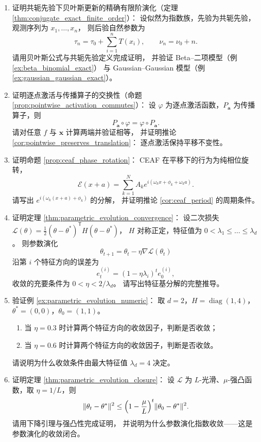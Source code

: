 \begin{enumerate}[leftmargin=3em, label=\textbf{题 \arabic*}]
    \item 证明共轭先验下贝叶斯更新的精确有限阶演化（定理 \ref{thm:conjugate_exact_finite_order}）：
    设似然为指数族，先验为共轭先验，观测序列为 $x_1,\dots,x_n$，
    则后验自然参数为
    \[
    \tau_n=\tau_0+\sum_{i=1}^nT(x_i),\qquad
    \nu_n=\nu_0+n.
    \]
    请用贝叶斯公式与共轭先验定义完成证明，
    并验证 Beta--二项模型（例 \ref{ex:beta_binomial_exact}）
    与 Gaussian--Gaussian 模型（例 \ref{ex:gaussian_gaussian_exact}）。

    \item 证明逐点激活与传播算子的交换性（命题 \ref{prop:pointwise_activation_commutes}）：
    设 $\varphi$ 为逐点激活函数，$P_{\mathbf{a}}$ 为传播算子，则
    \[
    P_{\mathbf{a}}\circ\varphi=\varphi\circ P_{\mathbf{a}}.
    \]
    请对任意 $f$ 与 $\mathbf{x}$ 计算两端并验证相等，
    并证明推论 \ref{cor:pointwise_preserves_translation}：
    逐点激活保持平移不变性。

    \item 证明命题 \ref{prop:ceaf_phase_rotation}：
    CEAF 在平移下的行为为纯相位旋转，
    \[
    \mathcal{E}(x+a)=\sum_{k=1}^{N}A_ke^{i(\omega_kx+\phi_k+\omega_ka)}.
    \]
    请写出 $e^{i(\omega_k(x+a)+\phi_k)}$ 的分解，
    并证明推论 \ref{cor:ceaf_period} 的周期条件。

    \item 证明定理 \ref{thm:parametric_evolution_convergence}：
    设二次损失 $\mathcal{L}(\theta)=\frac12(\theta-\theta^*)^{\mathsf T}H(\theta-\theta^*)$，
    $H$ 对称正定，特征值为 $0<\lambda_1\le\dots\le\lambda_d$。
    则参数演化
    \[
    \theta_{t+1}=\theta_t-\eta\nabla\mathcal{L}(\theta_t)
    \]
    沿第 $i$ 个特征方向的误差为
    \[
    e_t^{(i)}=(1-\eta\lambda_i)^te_0^{(i)},
    \]
    收敛的充要条件为 $0<\eta<2/\lambda_d$。
    请写出特征基分解的完整推导。

    \item 验证例 \ref{ex:parametric_evolution_numeric}：
    取 $d=2$，$H=\operatorname{diag}(1,4)$，$\theta^*=(0,0)$，$\theta_0=(1,1)$。
    \begin{enumerate}[label=(\roman*)]
        \item 当 $\eta=0.3$ 时计算两个特征方向的收敛因子，判断是否收敛；
        \item 当 $\eta=0.6$ 时计算两个特征方向的收敛因子，判断是否收敛。
    \end{enumerate}
    请说明为什么收敛条件由最大特征值 $\lambda_d=4$ 决定。

    \item 证明定理 \ref{thm:parametric_evolution_closure}：
    设 $\mathcal{L}$ 为 $L$-光滑、$\mu$-强凸函数，取 $\eta=1/L$，则
    \[
    \|\theta_t-\theta^*\|^2
    \le\Bigl(1-\frac{\mu}{L}\Bigr)^t\|\theta_0-\theta^*\|^2.
    \]
    请用下降引理与强凸性完成证明，
    并说明为什么参数演化指数收敛——这是参数演化的收敛闭合。


\end{enumerate}
